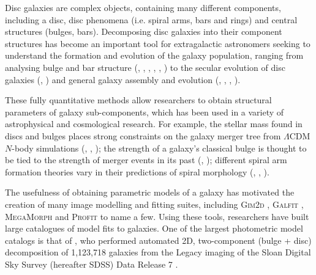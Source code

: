 \documentclass[main\.tex]{subfiles}
\begin{document}
\label{sec:introduction}

Disc galaxies are complex objects, containing many different components, including a disc, disc phenomena (i.e. spiral arms, bars and rings) and central structures (bulges, bars). Decomposing disc galaxies into their component structures has become an important tool for extragalactic astronomers seeking to understand the formation and evolution of the galaxy population, ranging from analysing bulge and bar structure (\citealt{1985ApJ...288..438E}, \citealt{1996A&AS..118..557D}, \citealt{2011MNRAS.415.3308G}, \citealt{Mendez-Abreu2016:1610.05324v1}, \citealt{Gao2017:1709.00746v1}, \citealt{2018MNRAS.473.4731K}) to the secular evolution of disc galaxies (\citealt{1998ApJ...500...75L}, \citealt{2005ApJ...635..959B}) and general galaxy assembly and evolution (\citealt{Simard2002:astro-ph/0205025v2}, \citealt{megamorph-paper}, \citealt{2012MNRAS.421.2277L}, \citealt{2019arXiv191002664R}).

These fully quantitative methods allow researchers to obtain structural parameters of galaxy sub-components, which has been used in a variety of astrophysical and cosmological research. For example, the stellar mass found in discs and bulges places strong constraints on the galaxy merger tree from $\Lambda$CDM $N$-body simulations (\citealt{2009MNRAS.396.1972P}, \citealt{Hopkins2010:1004.2708v3}, \citealt{2018MNRAS.475.5133R}); the strength of a galaxy's classical bulge is thought to be tied to the strength of merger events in its past (\citealt{2005ApJ...622L...9S}, \citealt{Kormendy2010:1009.3015v1}); different spiral arm formation theories vary in their predictions of spiral morphology (\citealt{Dobbs2014:1407.5062v1}, \citealt{Pour-Imani2016:1608.00969v1}, \citealt{2017MNRAS.472.2263H}).

The usefulness of obtaining parametric models of a galaxy has motivated the creation of many image modelling and fitting suites, including \textsc{Gim2d} \citep{gim2d-paper}, \textsc{Galfit} \citep{galfit-paper}, \textsc{MegaMorph} \citep{megamorph-paper} and \textsc{Profit} \citep{profit-paper} to name a few. Using these tools, researchers have built large catalogues of model fits to galaxies. One of the largest photometric model catalogs is that of \citet{2011ApJS..196...11S}, who performed automated 2D, two-component (bulge + disc) decomposition of 1,123,718 galaxies from the Legacy imaging of the Sloan Digital Sky Survey (hereafter SDSS) Data Release 7 \citep{SDSSDR7}.
\end{document}
